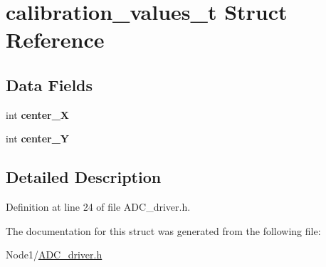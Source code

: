 \hypertarget{structcalibration__values__t}{}\section{calibration\+\_\+values\+\_\+t Struct Reference}
\label{structcalibration__values__t}
\subsection*{Data Fields}
\begin{DoxyCompactItemize}
\item 
\mbox{\label{structcalibration__values__t_ae9ac56af2c6683139e8c1234e675ff1e}} 
int {\bfseries center\+\_\+X}
\item 
\mbox{\label{structcalibration__values__t_af78d3fd2f138fc1404c346b4ef1f9f4e}} 
int {\bfseries center\+\_\+Y}
\end{DoxyCompactItemize}


\subsection{Detailed Description}


Definition at line 24 of file A\+D\+C\+\_\+driver.\+h.



The documentation for this struct was generated from the following file\+:\begin{DoxyCompactItemize}
\item 
Node1/\hyperlink{ADC__driver_8h}{A\+D\+C\+\_\+driver.\+h}\end{DoxyCompactItemize}

